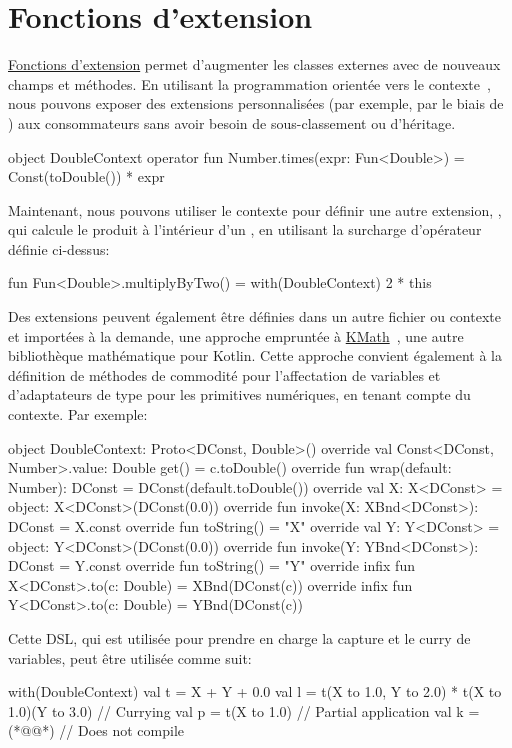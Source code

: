 \section{Fonctions d'extension}\label{sec:extension-functions}

\href{https://kotlinlang.org/docs/reference/extensions.html}{Fonctions d'extension} permet d'augmenter les classes externes avec de nouveaux champs et méthodes. En utilisant la programmation orientée vers le contexte~\citep{hirschfeld2008context}, nous pouvons exposer des extensions personnalisées (par exemple, par le biais de ) aux consommateurs sans avoir besoin de sous-classement ou d'héritage.
%
\begin{kotlinlisting}[caption={We can provide numerical extensions, wrapped in a context.}]
object DoubleContext {
    operator fun Number.times(expr: Fun<Double>) = Const(toDouble()) * expr
}
\end{kotlinlisting}
%
Maintenant, nous pouvons utiliser le contexte pour définir une autre extension, , qui calcule le produit à l'intérieur d'un , en utilisant la surcharge d'opérateur définie ci-dessus:
%
\begin{kotlinlisting}
fun Fun<Double>.multiplyByTwo() = with(DoubleContext) { 2 * this }
\end{kotlinlisting}
%
Des extensions peuvent également être définies dans un autre fichier ou contexte et importées à la demande, une approche empruntée à \href{https://github.com/mipt-npm/kmath}{KMath}~\citep{nozik2019kmath}, une autre bibliothèque mathématique pour Kotlin. Cette approche convient également à la définition de méthodes de commodité pour l'affectation de variables et d'adaptateurs de type pour les primitives numériques, en tenant compte du contexte. Par exemple:
%
\begin{kotlinlisting}
object DoubleContext: Proto<DConst, Double>() {
    override val Const<DConst, Number>.value: Double
    get() = c.toDouble()
    override fun wrap(default: Number): DConst = DConst(default.toDouble())
    override val X: X<DConst> = object: X<DConst>(DConst(0.0)) {
        override fun invoke(X: XBnd<DConst>): DConst = X.const
        override fun toString() = "X"
    }
    override val Y: Y<DConst> = object: Y<DConst>(DConst(0.0)) {
        override fun invoke(Y: YBnd<DConst>): DConst = Y.const
        override fun toString() = "Y"
    }
    override infix fun X<DConst>.to(c: Double) = XBnd(DConst(c))
    override infix fun Y<DConst>.to(c: Double) = YBnd(DConst(c))
}
\end{kotlinlisting}
%
Cette DSL, qui est utilisée pour prendre en charge la capture et le curry de variables, peut être utilisée comme suit:
%
\begin{kotlinlisting}
with(DoubleContext) {
    val t = X + Y + 0.0
    val l = t(X to 1.0, Y to 2.0) * t(X to 1.0)(Y to 3.0) // Currying
    val p = t(X to 1.0) // Partial application
    val k = (*@@*) // Does not compile
}
\end{kotlinlisting}

